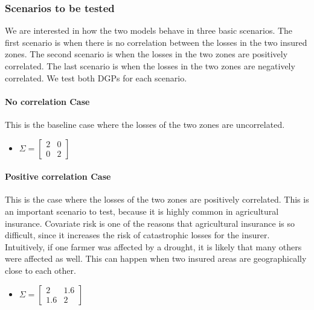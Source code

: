 \documentclass[11pt]{article}
\begin{document}
   \subsubsection{Scenarios to be tested}
     We are interested in how the two models behave in three basic scenarios. The first scenario is when there is no correlation between the losses in the two insured zones. The second scenario is when the losses in the two zones are positively correlated. The last scenario is when the losses in the two zones are negatively correlated. We test both DGPs for each scenario. 

     \paragraph*{No correlation Case}
      This is the baseline case where the losses of the two zones are uncorrelated. 
       \begin{itemize}
           \item $\Sigma = \begin{bmatrix}
               2 & 0 \\
               0 & 2 
               \end{bmatrix} $
       \end{itemize}

     \paragraph*{Positive correlation Case}
       This is the case where the losses of the two zones are positively correlated. This is an important scenario to test, because it is highly common in agricultural insurance. Covariate risk is one of the reasons that agricultural insurance is so difficult, since it increases the risk of catastrophic losses for the insurer. Intuitively, if one farmer was affected by a drought, it is likely that many others were affected as well. This can happen when two insured areas are geographically close to each other. 
       \begin{itemize}
           \item $\Sigma = \begin{bmatrix}
               2 & 1.6 \\
               1.6 & 2 
               \end{bmatrix} $
       \end{itemize}
\end{document}
